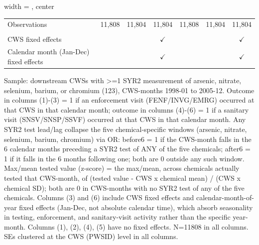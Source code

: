 \begin{table}[htbp]
\begin{adjustbox}{width = \textwidth, center}
\begin{tabular}{lcccccc}
          \\
         
         Observations                           & 11,808         & 11,804                 & 11,804          & 11,808         & 11,804          & 11,804\\  
         
          \\
         
         CWS fixed effects                      &                &                        & $\checkmark$    &                &                 & $\checkmark$\\   
         Calendar month (Jan-Dec) fixed effects &                &                        & $\checkmark$    &                &                 & $\checkmark$\\   
         
         \bottomrule
         
      \end{tabular}
      
      
      
   \end{adjustbox}
      {\tiny\linespread{1}\selectfont \par \raggedright 
   Sample: downstream CWSs with >=1 SYR2 measurement of arsenic, nitrate, selenium, barium, or chromium (123), CWS-months 1998-01 to 2005-12. Outcome in columns (1)-(3) = 1 if an enforcement visit (FENF/INVG/EMRG) occurred at that CWS in that calendar month; outcome in columns (4)-(6) = 1 if a sanitary visit (SNSV/SNSP/SSVF) occurred at that CWS in that calendar month. Any SYR2 test lead/lag collapse the five chemical-specific windows (arsenic, nitrate, selenium, barium, chromium) via OR: before6 = 1 if the CWS-month falls in the 6 calendar months preceding a SYR2 test of ANY of the five chemicals; after6 = 1 if it falls in the 6 months following one; both are 0 outside any such window. Max/mean tested value (z-score) = the max/mean, across chemicals actually tested that CWS-month, of (tested value - CWS x chemical mean) / (CWS x chemical SD); both are 0 in CWS-months with no SYR2 test of any of the five chemicals. Columns (3) and (6) include CWS fixed effects and calendar-month-of-year fixed effects (Jan-Dec, not absolute calendar time), which absorb seasonality in testing, enforcement, and sanitary-visit activity rather than the specific year-month. Columns (1), (2), (4), (5) have no fixed effects. N=11808 in all columns. SEs clustered at the CWS (PWSID) level in all columns.}
   
\end{table}


